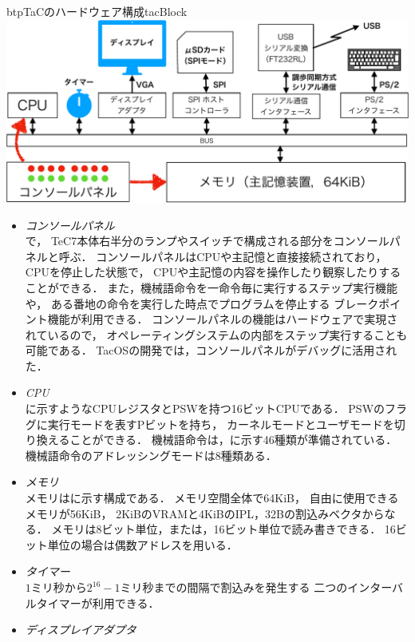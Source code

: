 \begin{myfig}{btp}{TaCのハードウェア構成}{tacBlock}
  \includegraphics[scale=0.55]{Fig/tacBlock-crop.pdf}
\end{myfig}

\begin{itemize}
\item \emph{コンソールパネル} \\
  で，
  TeC7本体右半分のランプやスイッチで構成される部分をコンソールパネルと呼ぶ．
  コンソールパネルはCPUや主記憶と直接接続されており，
  CPUを停止した状態で，
  CPUや主記憶の内容を操作したり観察したりすることができる．
  また，機械語命令を一命令毎に実行するステップ実行機能や，
  ある番地の命令を実行した時点でプログラムを停止する
  ブレークポイント機能が利用できる．
  コンソールパネルの機能はハードウェアで実現されているので，
  オペレーティングシステムの内部をステップ実行することも可能である．
  TacOSの開発では，コンソールパネルがデバッグに活用された．
\item \emph{CPU} \\
  に示すようなCPUレジスタとPSWを持つ16ビットCPUである．
  PSWのフラグに実行モードを表すPビットを持ち，
  カーネルモードとユーザモードを切り換えることができる．
  機械語命令は，に示す46種類が準備されている．
  機械語命令のアドレッシングモードは8種類ある．
\item \emph{メモリ} \\
  メモリはに示す構成である．
  メモリ空間全体で64KiB，
  自由に使用できるメモリが56KiB，
  2KiBのVRAMと4KiBのIPL，32Bの割込みベクタからなる．
  メモリは8ビット単位，または，16ビット単位で読み書きできる．
  16ビット単位の場合は偶数アドレスを用いる．
\item \emph{タイマー} \\
  $1$ミリ秒から$2^{16}-1$ミリ秒までの間隔で割込みを発生する
  二つのインターバルタイマーが利用できる．
\item \emph{ディスプレイアダプタ} \\

\end{itemize}
